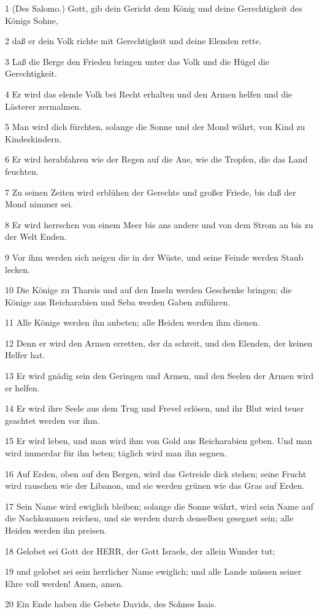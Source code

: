 \par 1 (Des Salomo.) Gott, gib dein Gericht dem König und deine Gerechtigkeit des Königs Sohne,
\par 2 daß er dein Volk richte mit Gerechtigkeit und deine Elenden rette.
\par 3 Laß die Berge den Frieden bringen unter das Volk und die Hügel die Gerechtigkeit.
\par 4 Er wird das elende Volk bei Recht erhalten und den Armen helfen und die Lästerer zermalmen.
\par 5 Man wird dich fürchten, solange die Sonne und der Mond währt, von Kind zu Kindeskindern.
\par 6 Er wird herabfahren wie der Regen auf die Aue, wie die Tropfen, die das Land feuchten.
\par 7 Zu seinen Zeiten wird erblühen der Gerechte und großer Friede, bis daß der Mond nimmer sei.
\par 8 Er wird herrschen von einem Meer bis ans andere und von dem Strom an bis zu der Welt Enden.
\par 9 Vor ihm werden sich neigen die in der Wüste, und seine Feinde werden Staub lecken.
\par 10 Die Könige zu Tharsis und auf den Inseln werden Geschenke bringen; die Könige aus Reicharabien und Seba werden Gaben zuführen.
\par 11 Alle Könige werden ihn anbeten; alle Heiden werden ihm dienen.
\par 12 Denn er wird den Armen erretten, der da schreit, und den Elenden, der keinen Helfer hat.
\par 13 Er wird gnädig sein den Geringen und Armen, und den Seelen der Armen wird er helfen.
\par 14 Er wird ihre Seele aus dem Trug und Frevel erlösen, und ihr Blut wird teuer geachtet werden vor ihm.
\par 15 Er wird leben, und man wird ihm von Gold aus Reicharabien geben. Und man wird immerdar für ihn beten; täglich wird man ihn segnen.
\par 16 Auf Erden, oben auf den Bergen, wird das Getreide dick stehen; seine Frucht wird rauschen wie der Libanon, und sie werden grünen wie das Gras auf Erden.
\par 17 Sein Name wird ewiglich bleiben; solange die Sonne währt, wird sein Name auf die Nachkommen reichen, und sie werden durch denselben gesegnet sein; alle Heiden werden ihn preisen.
\par 18 Gelobet sei Gott der HERR, der Gott Israels, der allein Wunder tut;
\par 19 und gelobet sei sein herrlicher Name ewiglich; und alle Lande müssen seiner Ehre voll werden! Amen, amen.
\par 20 Ein Ende haben die Gebete Davids, des Sohnes Isais.

